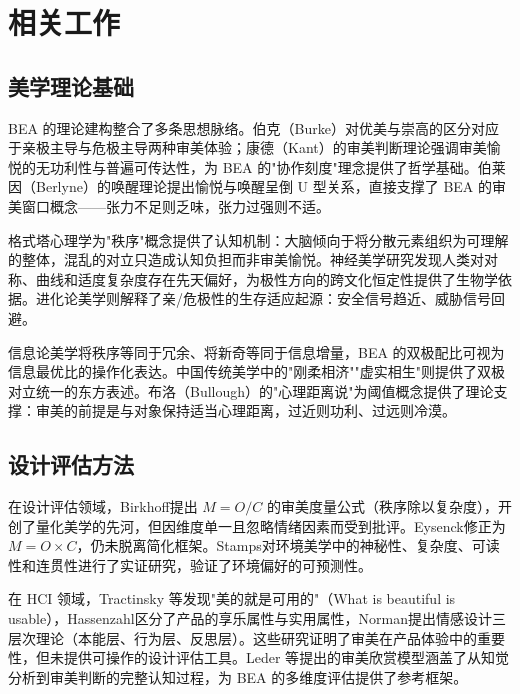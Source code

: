 \documentclass[10pt,a4paper]{article}
\begin{document}
\section{相关工作}

\subsection{美学理论基础}

BEA 的理论建构整合了多条思想脉络。伯克（Burke）对优美与崇高的区分\cite{burke1757}对应于亲极主导与危极主导两种审美体验；康德（Kant）的审美判断理论\cite{kant1790}强调审美愉悦的无功利性与普遍可传达性，为 BEA 的"协作刻度"理念提供了哲学基础。伯莱因（Berlyne）的唤醒理论\cite{berlyne1971}提出愉悦与唤醒呈倒 U 型关系，直接支撑了 BEA 的审美窗口概念——张力不足则乏味，张力过强则不适。

格式塔心理学\cite{arnheim1954}为"秩序"概念提供了认知机制：大脑倾向于将分散元素组织为可理解的整体，混乱的对立只造成认知负担而非审美愉悦。神经美学研究\cite{zeki1999,ramachandran1999}发现人类对对称、曲线和适度复杂度存在先天偏好，为极性方向的跨文化恒定性提供了生物学依据。进化论美学\cite{etcoff2000}则解释了亲/危极性的生存适应起源：安全信号趋近、威胁信号回避。

信息论美学\cite{moles1966}将秩序等同于冗余、将新奇等同于信息增量，BEA 的双极配比可视为信息最优比的操作化表达。中国传统美学中的"刚柔相济""虚实相生"则提供了双极对立统一的东方表述\cite{li2009}。布洛（Bullough）的"心理距离说"\cite{bullough1912}为阈值概念提供了理论支撑：审美的前提是与对象保持适当心理距离，过近则功利、过远则冷漠。

\subsection{设计评估方法}

在设计评估领域，Birkhoff\cite{birkhoff1933}提出 $M=O/C$ 的审美度量公式（秩序除以复杂度），开创了量化美学的先河，但因维度单一且忽略情绪因素而受到批评\cite{eysenck1941}。Eysenck\cite{eysenck41}修正为 $M=O \times C$，仍未脱离简化框架。Stamps\cite{stamps2000}对环境美学中的神秘性、复杂度、可读性和连贯性进行了实证研究，验证了环境偏好的可预测性。

在 HCI 领域，Tractinsky 等\cite{tractinsky2000}发现"美的就是可用的"（What is beautiful is usable），Hassenzahl\cite{hassenzahl2004}区分了产品的享乐属性与实用属性，Norman\cite{norman2004}提出情感设计三层次理论（本能层、行为层、反思层）。这些研究证明了审美在产品体验中的重要性，但未提供可操作的设计评估工具。Leder 等\cite{leder2004}提出的审美欣赏模型涵盖了从知觉分析到审美判断的完整认知过程，为 BEA 的多维度评估提供了参考框架。
\end{document}
